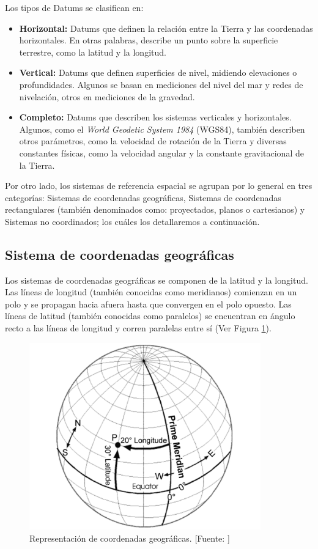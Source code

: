 Los tipos de Datums se clasifican en:
\begin{itemize}
    \item \textbf{Horizontal:} 
    Datums que definen la relación entre la Tierra y las coordenadas horizontales. En otras palabras, describe un punto sobre la superficie terrestre, como la latitud y la longitud.
    \item \textbf{Vertical:} 
    Datums que definen superficies de nivel, midiendo elevaciones o profundidades. Algunos se basan en mediciones del nivel del mar y redes de nivelación, otros en mediciones de la gravedad.
    \item \textbf{Completo:} 
    Datums que describen los sistemas verticales y horizontales. Algunos, como el \textit{World Geodetic System 1984} (WGS84), también describen otros parámetros, como la velocidad de rotación de la Tierra y diversas constantes físicas, como la velocidad angular y la constante gravitacional de la Tierra.
\end{itemize}

Por otro lado, los sistemas de referencia espacial se agrupan por lo general en tres categorías: Sistemas de coordenadas geográficas, Sistemas de coordenadas rectangulares (también denominados como: proyectados, planos o cartesianos) y Sistemas no coordinados; los cuáles los detallaremos a continuación.

\subsection{Sistema de coordenadas geográficas}
Los sistemas de coordenadas geográficas se componen de la latitud y la longitud. Las líneas de longitud (también conocidas como meridianos) comienzan en un polo y se propagan hacia afuera hasta que convergen en el polo opuesto. Las líneas de latitud (también conocidas como paralelos) se encuentran en ángulo recto a las líneas de longitud y corren paralelas entre sí (Ver Figura \ref{fig:latitudLongitud}). 

\begin{figure}[H]
    \centering
    \includegraphics[width=10cm]{CoordenadasGeograficas.png}
    \caption{Representación de coordenadas geográficas. [Fuente: \citet{Fazal2008GISBasics}]}
    \label{fig:latitudLongitud}
\end{figure}

